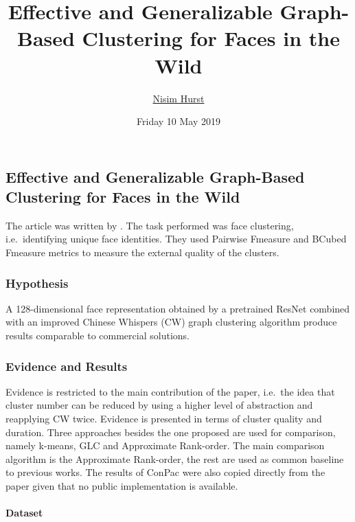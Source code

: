 \documentclass[17pt,]{extarticle}
\title{Effective and Generalizable Graph-Based Clustering for Faces in the Wild}
\author{\href{mailto:langheran@gmail.com}{Nisim Hurst}}
\date{Friday 10 May 2019}
\let\oldparagraph\paragraph
\renewcommand{\paragraph}[1]{\oldparagraph{#1}\mbox{}}
\begin{document}
\maketitle

\label{toc}

\hypertarget{effective-and-generalizable-graph-based-clustering-for-faces-in-the-wild}{%
\subsection{Effective and Generalizable Graph-Based Clustering for Faces in the Wild}\label{effective-and-generalizable-graph-based-clustering-for-faces-in-the-wild}}

The article was written by \autocite{leonardochang2018}. The task performed was face clustering, i.e.~identifying unique face identities. They used Pairwise Fmeasure and BCubed Fmeasure metrics to measure the external quality of the clusters.

\hypertarget{hypothesis}{%
\subsubsection{Hypothesis}\label{hypothesis}}

A 128-dimensional face representation obtained by a pretrained ResNet combined with an improved Chinese Whispers (CW) graph clustering algorithm produce results comparable to commercial solutions.

\hypertarget{evidence-and-results}{%
\subsubsection{Evidence and Results}\label{evidence-and-results}}

Evidence is restricted to the main contribution of the paper, i.e.~the idea that cluster number can be reduced by using a higher level of abstraction and reapplying CW twice. Evidence is presented in terms of cluster quality and duration. Three approaches besides the one proposed are used for comparison, namely k-means, GLC and Approximate Rank-order. The main comparison algorithm is the Approximate Rank-order, the rest are used as common baseline to previous works. The results of ConPac were also copied directly from the paper given that no public implementation is available.

\hypertarget{dataset}{%
\paragraph{Dataset}\label{dataset}}
\end{document}
